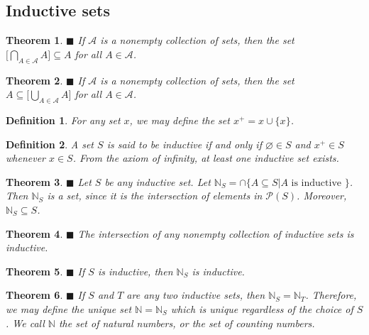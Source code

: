 \documentclass[a4paper]{article}
\newtheorem{mytheorem}{Theorem}
\newtheorem{mydef}{Definition}
\numberwithin{mytheorem}{section}
\numberwithin{mydef}{section}
\numberwithin{axiom}{section}
\numberwithin{example}{section}
\newcommand{\done}{$\blacksquare$ }
\begin{document}
\subsection{Inductive sets}

\begin{mytheorem} \done If $\mathcal{A}$ is a nonempty collection of sets, then the set  $\Big[\bigcap\limits_{A \in \mathcal{A}} A\Big] \subseteq A$ for all $A \in \mathcal{A}$.
\end{mytheorem}

\begin{mytheorem} \done If $\mathcal{A}$ is a nonempty collection of sets, then the set  $A \subseteq \Big[\bigcup\limits_{A \in \mathcal{A}} A\Big]$ for all $A \in \mathcal{A}$.
\end{mytheorem}

\begin{mydef} For any set $x$, we may define the set $x^{+} = x \cup \{ x \} $. 
\end{mydef}

\begin{mydef} A set $S$ is said to be inductive if and only if $\varnothing \in S$ and $x^{+} \in S$ whenever $x \in S$. From the axiom of infinity, at least one inductive set exists.
\end{mydef}

\begin{mytheorem} \done Let $S$ be any inductive set. Let $\mathbb{N}_{S} = \cap \{ A \subseteq S | A \text{ is inductive } \} $. Then $\mathbb{N}_{S}$ is a set, since it is the intersection of elements in $\mathcal{P}(S)$. Moreover, $\mathbb{N}_{S} \subseteq S$.
\end{mytheorem}

\begin{mytheorem} \done The intersection of any nonempty collection of inductive sets is inductive.
\end{mytheorem}

\begin{mytheorem} \done If $S$ is inductive, then $\mathbb{N}_{S}$ is inductive.
\end{mytheorem}

\begin{mytheorem}\done If $S$ and $T$ are any two inductive sets, then  $\mathbb{N}_{S} =  \mathbb{N}_{T}$. Therefore, we may define the unique set $\mathbb{N} = \mathbb{N}_{S}$ which is unique regardless of the choice of $S$. We call $\mathbb{N}$ the set of natural numbers, or the set of counting numbers.
\end{mytheorem}
\end{document}
